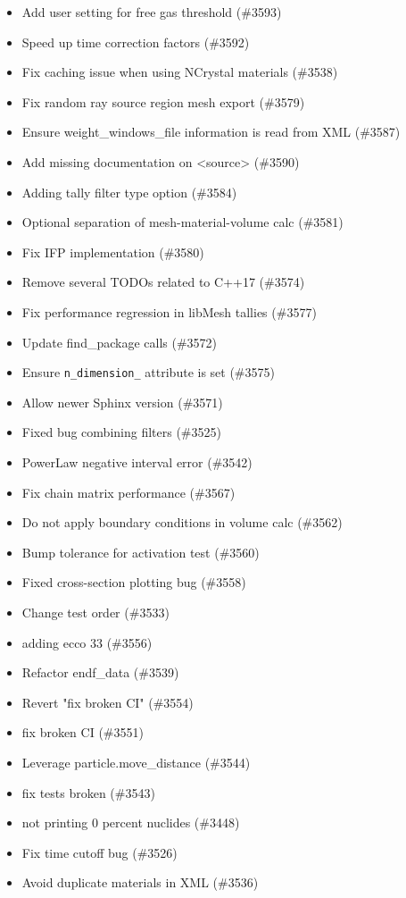 \begin{itemize}
\item Add user setting for free gas threshold (\#3593)
\item Speed up time correction factors (\#3592)
\item Fix caching issue when using NCrystal materials (\#3538)
\item Fix random ray source region mesh export (\#3579)
\item Ensure weight\_windows\_file information is read from XML (\#3587)
\item Add missing documentation on \textless source\textgreater{} (\#3590)
\item Adding tally filter type option (\#3584)
\item Optional separation of mesh-material-volume calc (\#3581)
\item Fix IFP implementation (\#3580)
\item Remove several TODOs related to C++17 (\#3574)
\item Fix performance regression in libMesh tallies (\#3577)
\item Update find\_package calls (\#3572)
\item Ensure \texttt{n\_dimension\_} attribute is set (\#3575)
\item Allow newer Sphinx version (\#3571)
\item Fixed bug combining filters (\#3525)
\item PowerLaw negative interval error (\#3542)
\item Fix chain matrix performance (\#3567)
\item Do not apply boundary conditions in volume calc (\#3562)
\item Bump tolerance for activation test (\#3560)
\item Fixed cross-section plotting bug (\#3558)
\item Change test order (\#3533)
\item adding ecco 33 (\#3556)
\item Refactor endf\_data (\#3539)
\item Revert "fix broken CI" (\#3554)
\item fix broken CI (\#3551)
\item Leverage particle.move\_distance (\#3544)
\item fix tests broken (\#3543)
\item not printing 0 percent nuclides (\#3448)
\item Fix time cutoff bug (\#3526)
\item Avoid duplicate materials in XML (\#3536)

\end{itemize}
